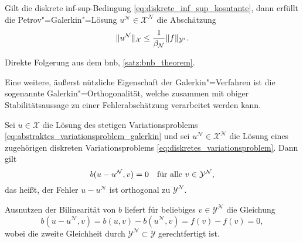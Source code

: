 \documentclass[../main.tex]{subfiles}
\begin{document}
\begin{Satz}
    \label{satz:galerkin_stabilitaet}
    Gilt die diskrete inf-sup-Bedingung \cref{eq:diskrete_inf_sup_kosntante}, dann erfüllt die Petrov"=Galerkin"=Lösung $u^{\mathcal N} \in \mathcal X^{\mathcal N}$ die Abschätzung
    \begin{equation}
        \label{eq:galerkin_statibilitaet}
        \norm{u^{\mathcal N}}_{\mathcal X} \leq \frac{1}{\beta_{\mathcal N}} \norm{f}_{\mathcal Y'}.
    \end{equation}

    \begin{Beweis}
        Direkte Folgerung aus dem \acl{bnb}, \cref{satz:bnb_theorem}.
    \end{Beweis}
\end{Satz}

Eine weitere, äußerst nützliche Eigenschaft der Galerkin"=Verfahren ist die sogenannte Galerkin"=Orthogonalität, welche zusammen mit obiger Stabilitätsaussage zu einer Fehlerabschätzung verarbeitet werden kann.

\begin{Lemma}
    \label{lemma:galerkin_orthogonalitaet}
    Sei $u \in \mathcal X$ die Lösung des stetigen Variationsproblems \cref{eq:abstraktes_variationsproblem_galerkin} und sei $u^{\mathcal N} \in \mathcal X^{\mathcal N}$ die Lösung eines zugehörigen diskreten Variationsproblems \cref{eq:diskretes_variationsproblem}.
    Dann gilt
    \begin{equation}
        \label{eq:galerkin_orthogonalitaet}
        b(u - u^{\mathcal N}, v) = 0 \quad \fa v \in \mathcal Y^{\mathcal N},
    \end{equation}
    das heißt, der Fehler $u - u^{\mathcal N}$ ist orthogonal zu $\mathcal Y^{\mathcal N}$.

    \begin{Beweis}
        Ausnutzen der Bilinearität von $b$ liefert für beliebiges $v \in \mathcal Y^{\mathcal N}$ die Gleichung
        \begin{equation}
            b(u - u^{\mathcal N}, v) = b(u, v) - b(u^{\mathcal N}, v) = f(v) - f(v) = 0,
        \end{equation}
        wobei die zweite Gleichheit durch $\mathcal Y^{\mathcal N} \subset \mathcal Y$ gerechtfertigt ist.
    \end{Beweis}
\end{Lemma}
\end{document}

